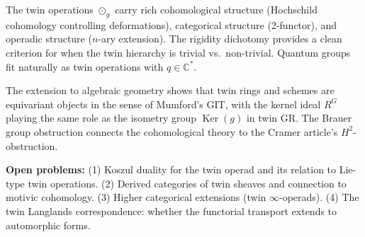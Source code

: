 \documentclass[11pt,twocolumn]{article}
\theoremstyle{plain}\newtheorem{theorem}{Theorem}\newtheorem{proposition}[theorem]{Proposition}\newtheorem{corollary}[theorem]{Corollary}\newtheorem{lemma}[theorem]{Lemma}
\theoremstyle{definition}\newtheorem{definition}[theorem]{Definition}\newtheorem{example}[theorem]{Example}
\theoremstyle{remark}\newtheorem{remark}[theorem]{Remark}
\newcommand{\Ker}{\operatorname{Ker}}
\begin{document}
The twin operations $\odot_g$ carry rich cohomological structure (Hochschild cohomology controlling deformations), categorical structure (2-functor), and operadic structure ($n$-ary extension). The rigidity dichotomy provides a clean criterion for when the twin hierarchy is trivial vs.\ non-trivial. Quantum groups fit naturally as twin operations with $q \in \mathbb{C}^*$.

The extension to algebraic geometry shows that twin rings and schemes are equivariant objects in the sense of Mumford's GIT, with the kernel ideal $R^G$ playing the same role as the isometry group $\Ker(g)$ in twin GR. The Brauer group obstruction connects the cohomological theory to the Cramer article's $H^2$-obstruction.

\textbf{Open problems:} (1) Koszul duality for the twin operad and its relation to Lie-type twin operations. (2) Derived categories of twin sheaves and connection to motivic cohomology. (3) Higher categorical extensions (twin $\infty$-operads). (4) The twin Langlands correspondence: whether the functorial transport extends to automorphic forms.
\end{document}
